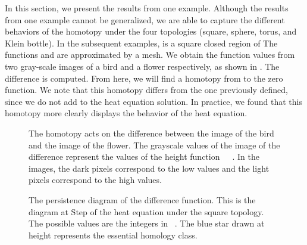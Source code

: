 In this section, we present the results from one example.  Although the results
from one example cannot be generalized, we are able to capture the different
behaviors of the homotopy under the four topologies (square, sphere, torus, and 
Klein bottle).  In the subsequent examples,  is a square closed region of 
    The functions   and  are approximated by a  
mesh.  We obtain the function values from two gray-scale images of a bird and 
a flower respectively, as shown in .  The difference 
 is computed.  From here, we will find a homotopy from  to the 
zero function.  We note that this homotopy differs from the one previously
defined, since we do not add  to the heat equation solution.
In practice, we found that this homotopy more clearly displays the behavior of the
heat equation.
\begin{figure}[ht] \centering
	\caption[Images of the Homotopy]{The homotopy acts on the difference
                between the image of the bird and the image of the flower.
                The grayscale values of the image of the difference represent
                the values of the height function　\ .  In the images,
                the dark pixels correspond to the low values and the light
                pixels correspond to the high values.
                }\label{fig:htpyImages}
\end{figure}
\begin{figure}[hbt] \vspace*{0.1in}
 \centering
 \centerline{}
 \caption{The persistence diagram of the difference function.  This is the diagram
          at Step  of the heat equation under the square topology.  The
          possible values are the integers in ~.  The blue
          star drawn at height  represents the essential homology class.}
 \label{fig-01:Sumi}
\end{figure}

